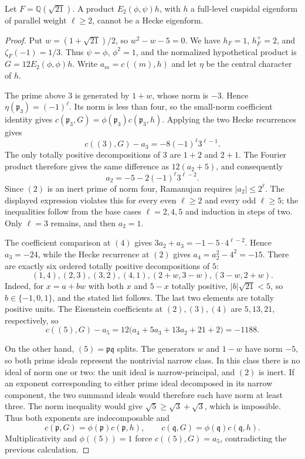 
\begin{proposition}
Let $F=\mathbb Q(\sqrt{21})$. A product $E_2(\phi,\psi)h$, with $h$
a full-level cuspidal eigenform of parallel weight $\ell\ge2$, cannot
be a Hecke eigenform.
\end{proposition}

\begin{proof}
Put $w=(1+\sqrt{21})/2$, so $w^2-w-5=0$.
We have $h_F=1$, $h_F^+=2$, and $\zeta_F(-1)=1/3$.
Thus $\psi=\phi$, $\phi^2=1$, and the normalized hypothetical product
is $G=12E_2(\phi,\phi)h$. Write $a_m=c((m),h)$ and let $\eta$
be the central character of $h$.

The prime above $3$ is generated by $1+w$, whose norm is $-3$.
Hence $\eta(\mathfrak p_3)=(-1)^\ell$. Its norm is less than four,
so the small-norm coefficient identity gives
$c(\mathfrak p_3,G)=\phi(\mathfrak p_3)c(\mathfrak p_3,h)$.
Applying the two Hecke recurrences gives
\[
 c((3),G)-a_3=-8(-1)^\ell3^{\ell-1}.
\]
The only totally positive decompositions of $3$ are $1+2$ and $2+1$.
The Fourier product therefore gives the same difference as $12(a_2+5)$,
and consequently
\[
 a_2=-5-2(-1)^\ell3^{\ell-2}.
\]
Since $(2)$ is an inert prime of norm four, Ramanujan requires
$|a_2|\le2^\ell$. The displayed expression violates this for every
even $\ell\ge2$ and every odd $\ell\ge5$; the inequalities follow
from the base cases $\ell=2,4,5$ and induction in steps of two.
Only $\ell=3$ remains, and then $a_2=1$.

The coefficient comparison at $(4)$ gives
$3a_2+a_3=-1-5\cdot4^{\ell-2}$. Hence $a_3=-24$, while the Hecke
recurrence at $(2)$ gives $a_4=a_2^2-4^2=-15$.
There are exactly six ordered totally positive decompositions of $5$:
\[
 (1,4),(2,3),(3,2),(4,1),(2+w,3-w),(3-w,2+w).
\]
Indeed, for $x=a+bw$ with both $x$ and $5-x$ totally positive,
$|b|\sqrt{21}<5$, so $b\in\{-1,0,1\}$, and the stated list follows.
The last two elements are totally positive units. The Eisenstein
coefficients at $(2),(3),(4)$ are $5,13,21$, respectively, so
\[
 c((5),G)-a_5
 =12\bigl(a_4+5a_3+13a_2+21+2\bigr)=-1188.
\]

On the other hand, $(5)=\mathfrak p\mathfrak q$ splits. The generators
$w$ and $1-w$ have norm $-5$, so both prime ideals represent the
nontrivial narrow class. In this class there is no ideal of norm one
or two: the unit ideal is narrow-principal, and $(2)$ is inert.
If an exponent corresponding to either prime ideal decomposed in its
narrow component, the two summand ideals would therefore each have norm
at least three. The norm inequality would give
$\sqrt5\ge\sqrt3+\sqrt3$, which is impossible.
Thus both exponents are indecomposable and
\[
 c(\mathfrak p,G)=\phi(\mathfrak p)c(\mathfrak p,h),\qquad
 c(\mathfrak q,G)=\phi(\mathfrak q)c(\mathfrak q,h).
\]
Multiplicativity and $\phi((5))=1$ force $c((5),G)=a_5$,
contradicting the previous calculation.
\end{proof}
